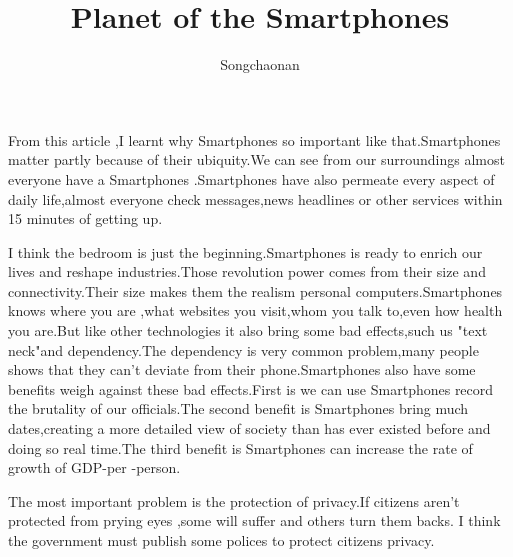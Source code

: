 \documentclass{ctexart}
\begin{document}
\title{Planet of the Smartphones}
\author{Songchaonan}
\maketitle
\par From this article ,I learnt why Smartphones so important like that.Smartphones matter partly because of their ubiquity.We can see from our surroundings almost everyone have a Smartphones .Smartphones have also permeate every aspect of daily life,almost everyone check messages,news headlines or other services within 15 minutes of getting up.
\par I think the bedroom is just the beginning.Smartphones is ready to enrich our lives and reshape industries.Those revolution power comes from their size and connectivity.Their size makes them  the realism personal computers.Smartphones knows where you are ,what websites you visit,whom you talk to,even how health you are.But like other technologies it also bring some bad effects,such us "text neck"and dependency.The dependency is very common problem,many people shows that they can't deviate from their phone.Smartphones also have some benefits weigh against these bad effects.First is we can use Smartphones record the brutality of our officials.The second benefit is Smartphones bring much dates,creating a more detailed view of society than has ever existed before and doing so real time.The third benefit is Smartphones can increase the rate of growth of GDP-per -person.
\par The most important problem is the protection of privacy.If citizens aren't protected from prying eyes ,some will suffer and others turn them backs. I think the government must publish some polices to protect citizens privacy.
\end{document}
